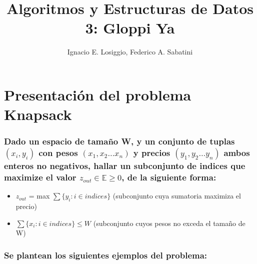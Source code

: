 \documentclass[fleqn, 11pt]{article}
\title{Algoritmos y Estructuras de Datos 3: Gloppi Ya}
\author{Ignacio E. Losiggio, Federico A. Sabatini}
\begin{document}
\maketitle
\section{Presentación del problema Knapsack} 

\subsubsection{Dado un espacio de tamaño W, y un conjunto de tuplas $(x_i, y_i)$ con pesos $(x_1, x_2 \dots x_n)$ y precios $(y_1, y_2 \dots y_n)$ ambos enteros no negativos,
hallar un subconjunto de indices que maximize el valor $z_{out} \in\mathbb{E} \geq 0$, de la siguiente forma:}

\begin{itemize}
	\item $z_{out} $ = max $\sum \{ y_i : i \in indices \} $ (subconjunto cuya sumatoria maximiza el precio)
	\item $\sum \{ x_i : i \in indices \} \le W $ (subconjunto cuyos pesos no exceda el tamaño de W)
\end{itemize}

\subsubsection{Se plantean los siguientes ejemplos del problema:}
\end{document}

